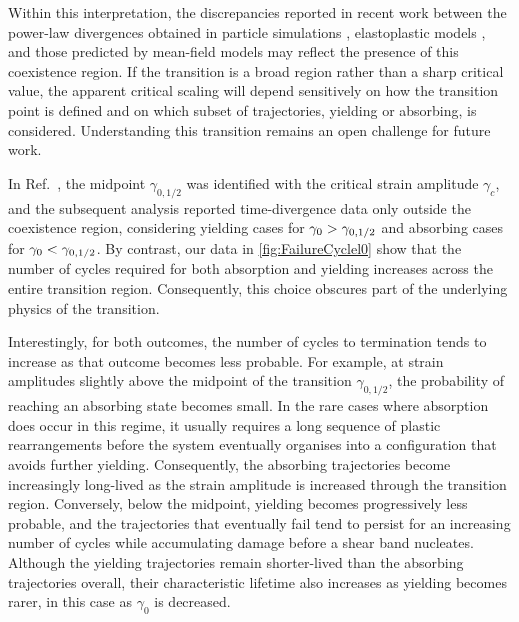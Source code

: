 Within this interpretation, the discrepancies reported in recent work between the power-law divergences obtained in particle simulations \cite{Maity2026,khandareElastoplasticModellingCyclic2026,kawasakiMacroscopicYieldingJammed2016}, elastoplastic models \cite{khandareElastoplasticModellingCyclic2026}, and those predicted by mean-field models \cite{parleyMeanFieldTheoryYielding2022,sarkar2025coarsegraineddescriptionsdynamics} may reflect the presence of this coexistence region. If the transition is a broad region rather than a sharp critical value, the apparent critical scaling will depend sensitively on how the transition point is defined and on which subset of trajectories, yielding or absorbing, is considered. Understanding this transition remains an open challenge for future work.

In Ref.~\cite{khandareElastoplasticModellingCyclic2026}, the midpoint $\gamma_{0,1/2}$ was identified with the critical strain amplitude $\gamma_c$, and the subsequent analysis reported time-divergence data only outside the coexistence region, considering yielding cases for $\gamma_0 > \gamma_{0,1/2}$ and absorbing cases for $\gamma_0 < \gamma_{0,1/2}$. By contrast, our data in \cref{fig:FailureCyclel0} show that the number of cycles required for both absorption and yielding increases across the entire transition region. Consequently, this choice obscures part of the underlying physics of the transition.

Interestingly, for both outcomes, the number of cycles to termination tends to increase as that outcome becomes less probable. For example, at strain amplitudes slightly above the midpoint of the transition $\gamma_{0,1/2}$, the probability of reaching an absorbing state becomes small. In the rare cases where absorption does occur in this regime, it usually requires a long sequence of plastic rearrangements before the system eventually organises into a configuration that avoids further yielding. Consequently, the absorbing trajectories become increasingly long-lived as the strain amplitude is increased through the transition region. Conversely, below the midpoint, yielding becomes progressively less probable, and the trajectories that eventually fail tend to persist for an increasing number of cycles while accumulating damage before a shear band nucleates. Although the yielding trajectories remain shorter-lived than the absorbing trajectories overall, their characteristic lifetime also increases as yielding becomes rarer, in this case as $\gamma_0$ is decreased.

